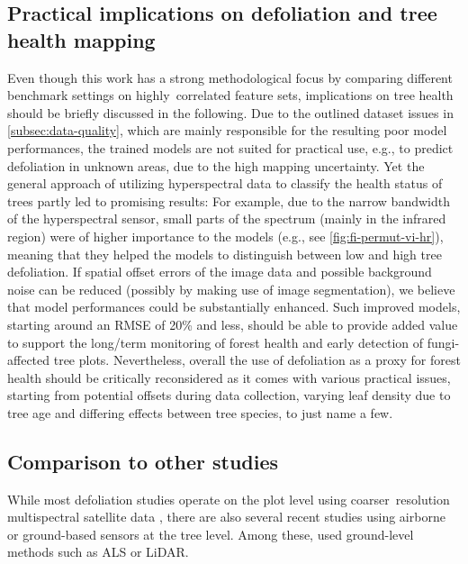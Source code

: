 \documentclass[remotesensing,article,submit,moreauthors,pdftex]{Definitions/mdpi}
\begin{document}
\subsection{Practical implications on defoliation and tree health mapping}
Even though this work has a strong methodological focus by comparing different benchmark settings on highly\ correlated feature sets, implications on tree health should be briefly discussed in the following.
Due to the outlined dataset issues in \autoref{subsec:data-quality}, which are mainly responsible for the resulting poor model performances, the trained models are not suited for practical use, e.g., to predict defoliation in unknown areas, due to the high mapping uncertainty.
Yet the general approach of utilizing hyperspectral data to classify the health status of trees partly led to promising results:
For example, due to the narrow bandwidth of the hyperspectral sensor, small parts of the spectrum (mainly in the infrared region) were of higher importance to the models (e.g., see \autoref{fig:fi-permut-vi-hr}), meaning that they helped the models to distinguish between low and high tree defoliation.
If spatial offset errors of the image data and possible background noise can be reduced (possibly by making use of image segmentation), we believe that model performances could be substantially enhanced.
Such improved models, starting around an RMSE of 20\% and less, should be able to provide added value to support the long\-/term monitoring of forest health and early detection of fungi-affected tree plots.
Nevertheless, overall the use of defoliation as a proxy for forest health should be critically reconsidered as it comes with various practical issues, starting from potential offsets during data collection, varying leaf density due to tree age and differing effects between tree species, to just name a few.

\subsection{Comparison to other studies}

While most defoliation studies operate on the plot level using coarser\ resolution multispectral satellite data \cite{townsend2012, debeurs2008, rengarajan2016}, there are also several recent studies using airborne or ground-based sensors at the tree level.
Among these, \cite{meng2018, kalin2019} used ground-level methods such as \ac{ALS} or \ac{LiDAR}.
\end{document}
